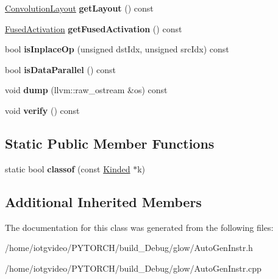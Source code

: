 \begin{DoxyCompactItemize}
\hyperlink{namespaceglow_aa2f3a33e05699df0f42295c5c4bd1f77}{Convolution\+Layout} {\bfseries get\+Layout} () const
\item 
\mbox{\label{classglow_1_1_convolution_grad_inst_a69e006d626f24ef00b8c63addd90202d}} 
\hyperlink{namespaceglow_ae88f2cc9ccac93130ee1cc326d968a21}{Fused\+Activation} {\bfseries get\+Fused\+Activation} () const
\item 
\mbox{\label{classglow_1_1_convolution_grad_inst_a6b528911eaa582b9fffa71d121b346e9}} 
bool {\bfseries is\+Inplace\+Op} (unsigned dst\+Idx, unsigned src\+Idx) const
\item 
\mbox{\label{classglow_1_1_convolution_grad_inst_ab4c7a638a9c398594d1ae3f06a07a347}} 
bool {\bfseries is\+Data\+Parallel} () const
\item 
\mbox{\label{classglow_1_1_convolution_grad_inst_aafa9c8d3125bd7126b1737090f5cbe67}} 
void {\bfseries dump} (llvm\+::raw\+\_\+ostream \&os) const
\item 
\mbox{\label{classglow_1_1_convolution_grad_inst_a2e21db9f556acf7318f487016cc0729e}} 
void {\bfseries verify} () const
\end{DoxyCompactItemize}
\subsection*{Static Public Member Functions}
\begin{DoxyCompactItemize}
\item 
\mbox{\label{classglow_1_1_convolution_grad_inst_ad60d987bc4b0b0128e68fa1a3bedba8f}} 
static bool {\bfseries classof} (const \hyperlink{classglow_1_1_kinded}{Kinded} $\ast$k)
\end{DoxyCompactItemize}
\subsection*{Additional Inherited Members}


The documentation for this class was generated from the following files\+:\begin{DoxyCompactItemize}
\item 
/home/iotgvideo/\+P\+Y\+T\+O\+R\+C\+H/build\+\_\+\+Debug/glow/Auto\+Gen\+Instr.\+h\item 
/home/iotgvideo/\+P\+Y\+T\+O\+R\+C\+H/build\+\_\+\+Debug/glow/Auto\+Gen\+Instr.\+cpp\end{DoxyCompactItemize}
